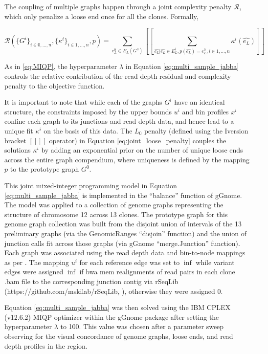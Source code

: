 \documentclass[phd,tocprelim]{cornell}
\begin{document}
The coupling of multiple graphs happen through a joint complexity penalty $\mathcal{R}$, which only penalize a loose end once for all the clones. Formally,

\begin{equation} \label{eq:joint_loose_penalty}
    \mathcal{R}(\{G^i\}_{i \in 0, \dots, n}, \{\kappa^i\}_{i \in 1, \dots, n}, p) = \sum_{e^{0}_{L} \in E_{L}(G^0)}[\![ \sum_{\hat{e_L}|\hat{e_L} \in E^{i}_{L}, p(\hat{e_L})=e^{0}_{L}, i \in 1,\dots,n} \kappa^i( \hat{e_L} ) ]\!]
\end{equation}

As in \ref{eq:MIQP}, the hyperparameter $\lambda$ in Equation \ref{eq:multi_sample_jabba} controls the relative contribution of the read-depth residual and complexity penalty to the objective function. 

It is important to note that while each of the graphs $G^i$ have an identical structure, the constraints imposed by the upper bounds $u^i$ and bin profiles $x^i$ confine each graph to its junctions and read depth data, and hence lead to a unique fit $κ^i$ on the basis of this data. The $L_0$ penalty (defined using the Iversion bracket $[\![]\!]$ operator) in Equation \ref{eq:joint_loose_penalty} couples the solutions $κ^i$ by adding an exponential prior on the number of unique loose ends across the entire graph compendium, where uniqueness is defined by the mapping $p$ to the prototype graph $G^0$.

This joint mixed-integer programming model in Equation \ref{eq:multi_sample_jabba} is implemented in the “balance” function of gGnome. The model was applied to a collection of genome graphs representing the structure of chromosome 12 across 13 clones. The prototype graph for this genome graph collection was built from the disjoint union of intervals of the 13 preliminary graphs (via the GenomicRanges “disjoin” function) and the union of junction calls fit across those graphs (via gGnome “merge.Junction” function). Each graph was associated using the read depth data and bin-to-node mappings as per \cite{Hadi2020-um}. The mapping $u^i$ for each reference edge was set to $\inf$ while variant edges were assigned $\inf$ if bwa mem realignments of read pairs in each clone .bam file to the corresponding junction contig via rSeqLib (https://github.com/mskilab/rSeqLib, \cite{Wala2017-ud}), otherwise they were assigned 0.

Equation \ref{eq:multi_sample_jabba} was then solved using the IBM CPLEX (v12.6.2) MIQP optimizer within the gGnome package after setting the hyperparameter $\lambda$ to 100.  This value was chosen after a parameter sweep observing for the visual concordance of genome graphs, loose ends, and read depth profiles in the region.
\end{document}
